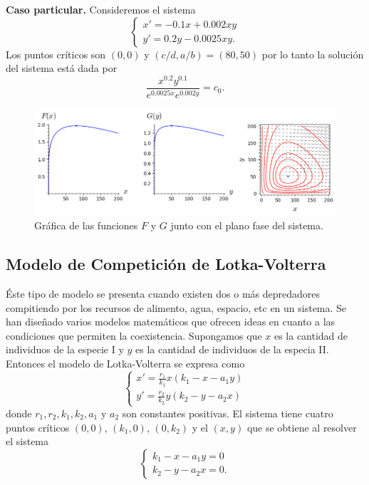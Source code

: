 \documentclass[11pt,letterpaper,draft]{report}
\newcommand\<{\langle}
\renewcommand\>{\rangle}
\begin{document}
\noindent \textbf{Caso particular.} Consideremos el sistema
\[
  \begin{cases}
    x' = -0.1x + 0.002xy\\
    y' = 0.2y - 0.0025xy.
  \end{cases}
\] Los puntos críticos son $(0,0)$ y $(c / d, a / b) = (80, 50)$
por lo tanto la solución del sistema está dada por
\[
\frac{x^{0.2}y^{0.1}}{e^{0.0025x}e^{0.002y}} = c_0.
\] 
\begin{figure}[h]
  \centering
  \includegraphics[width=1.\linewidth]{img/lotka-volterra-1.png}
  \caption{
    Gráfica de las funciones $F$ y $G$ junto con
    el plano fase del sistema.}%
  \label{fig:lotka-volterra-1}
\end{figure}

\subsection{Modelo de Competición de Lotka-Volterra}

Éste tipo de modelo se presenta cuando existen dos o más
depredadores compitiendo por los recursos de alimento, agua,
espacio, etc en un sistema. Se han diseñado varios modelos
matemáticos que ofrecen ideas en cuanto a las condiciones que 
permiten la coexistencia. Supongamos que $x$ es la cantidad 
de individuos de la especie I y $y$ es la cantidad de 
individuos de la especia II. Entonces el modelo de Lotka-Volterra
se expresa como
\[
\begin{cases}
  x' = \frac{r_1}{k_1}x(k_1 - x - a_1 y)\\
  y' = \frac{r_2}{k_2}y(k_2 - y - a_2 x)
\end{cases}
\] donde $r_1, r_2, k_1, k_2, a_1$ y $a_2$ son constantes positivas.
El sistema tiene cuatro puntos críticos $(0,0)$, $(k_1,0)$, $(0,k_2)$
y el $(x,y)$ que se obtiene al resolver el sistema
\[
\begin{cases}
  k_1 - x - a_1 y = 0\\
  k_2 - y - a_2 x = 0.
\end{cases}
\] 
\end{document}
